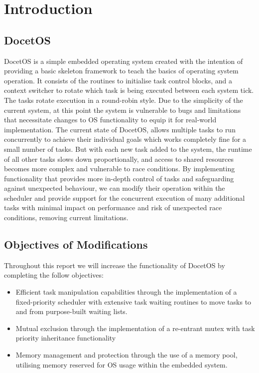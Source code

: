 \section{Introduction}
\subsection{DocetOS}
DocetOS is a simple embedded operating system created with the intention of providing a basic skeleton framework to teach the basics of operating system operation. It consists of the routines to initialise task control blocks, and a context switcher to rotate which task is being executed between each system tick. The tasks rotate execution in a round-robin style. Due to the simplicity of the current system, at this point the system is vulnerable to bugs and limitations that necessitate changes to OS functionality to equip it for real-world implementation.\hfill\newline
The current state of DocetOS, allows multiple tasks to run concurrently to achieve their individual goals which works completely fine for a small number of tasks. But with each new task added to the system, the runtime of all other tasks slows down proportionally, and access to shared resources becomes more complex and vulnerable to race conditions. By implementing functionality that provides more in-depth control of tasks and safeguarding against unexpected behaviour, we can modify their operation within the scheduler and provide support for the concurrent execution of many additional tasks with minimal impact on performance and risk of unexpected race conditions, removing current limitations.

\subsection{Objectives of Modifications}
Throughout this report we will increase the functionality of DocetOS by completing the follow objectives:
\begin{itemize}
	\item	Efficient task manipulation capabilities through the implementation of a fixed-priority scheduler with extensive task waiting routines to move tasks to and from purpose-built waiting lists.
	\item	Mutual exclusion through the implementation of a re-entrant mutex with task priority inheritance functionality
	\item	Memory management and protection through the use of a memory pool, utilising memory reserved for OS usage within the embedded system.

\end{itemize}

